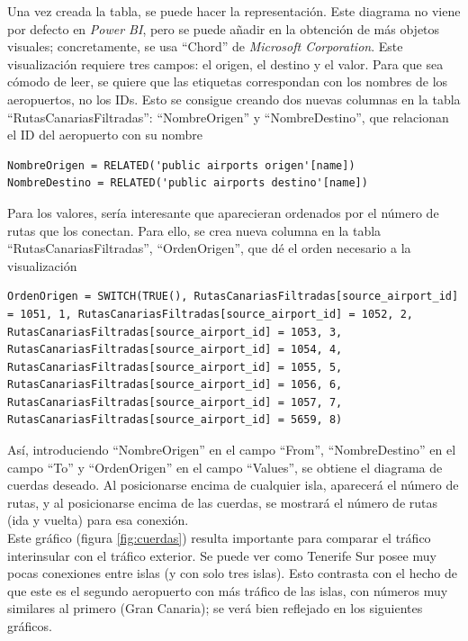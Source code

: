 \documentclass[11pt]{opticajnl}
\begin{document}
Una vez creada la tabla, se puede hacer la representación. Este diagrama no viene por defecto en \textit{Power BI}, pero se puede añadir en la obtención de más objetos visuales; concretamente, se usa ``Chord'' de \textit{Microsoft Corporation}. Este visualización requiere tres campos: el origen, el destino y el valor. Para que sea cómodo de leer, se quiere que las etiquetas correspondan con los nombres de los aeropuertos, no los IDs. Esto se consigue creando dos nuevas columnas en la tabla ``RutasCanariasFiltradas'': ``NombreOrigen'' y ``NombreDestino'', que relacionan el ID del aeropuerto con su nombre
\begin{lstlisting}[style=terminal]
NombreOrigen = RELATED('public airports origen'[name])
NombreDestino = RELATED('public airports destino'[name])
\end{lstlisting}

Para los valores, sería interesante que aparecieran ordenados por el número de rutas que los conectan. Para ello, se crea nueva columna en la tabla ``RutasCanariasFiltradas'', ``OrdenOrigen'', que dé el orden necesario a la visualización
\begin{lstlisting}[style=terminal]
OrdenOrigen = SWITCH(TRUE(), RutasCanariasFiltradas[source_airport_id] = 1051, 1, RutasCanariasFiltradas[source_airport_id] = 1052, 2, RutasCanariasFiltradas[source_airport_id] = 1053, 3, RutasCanariasFiltradas[source_airport_id] = 1054, 4, RutasCanariasFiltradas[source_airport_id] = 1055, 5, RutasCanariasFiltradas[source_airport_id] = 1056, 6, RutasCanariasFiltradas[source_airport_id] = 1057, 7, RutasCanariasFiltradas[source_airport_id] = 5659, 8)
\end{lstlisting}

Así, introduciendo ``NombreOrigen'' en el campo ``From'', ``NombreDestino'' en el campo ``To'' y ``OrdenOrigen'' en el campo ``Values'', se obtiene el diagrama de cuerdas deseado. Al posicionarse encima de cualquier isla, aparecerá el número de rutas, y al posicionarse encima de las cuerdas, se mostrará el número de rutas (ida y vuelta) para esa conexión. \\

Este gráfico (figura \ref{fig:cuerdas}) resulta importante para comparar el tráfico interinsular con el tráfico exterior. Se puede ver como Tenerife Sur posee muy pocas conexiones entre islas (y con solo tres islas). Esto contrasta con el hecho de que este es el segundo aeropuerto con más tráfico de las islas, con números muy similares al primero (Gran Canaria); se verá bien reflejado en los siguientes gráficos. 
\end{document}
